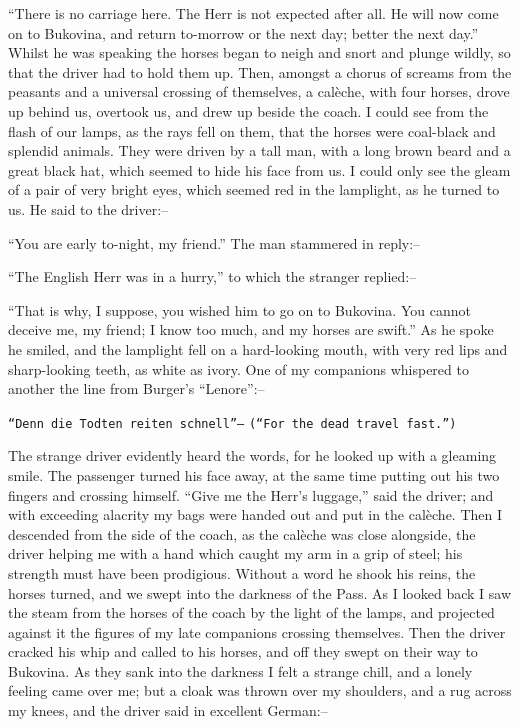 \documentclass[12pt,openright]{book}
\begin{document}
“There is no carriage here. The Herr is not expected after all. He will now come on to Bukovina, and return to-morrow or the next day; better the next day.” Whilst he was speaking the horses began to neigh and snort and plunge wildly, so that the driver had to hold them up. Then, amongst a chorus of screams from the peasants and a universal crossing of themselves, a calèche, with four horses, drove up behind us, overtook us, and drew up beside the coach. I could see from the flash of our lamps, as the rays fell on them, that the horses were coal-black and splendid animals. They were driven by a tall man, with a long brown beard and a great black hat, which seemed to hide his face from us. I could only see the gleam of a pair of very bright eyes, which seemed red in the lamplight, as he turned to us. He said to the driver:–

“You are early to-night, my friend.” The man stammered in reply:–

“The English Herr was in a hurry,” to which the stranger replied:–

“That is why, I suppose, you wished him to go on to Bukovina. You cannot deceive me, my friend; I know too much, and my horses are swift.” As he spoke he smiled, and the lamplight fell on a hard-looking mouth, with very red lips and sharp-looking teeth, as white as ivory. One of my companions whispered to another the line from Burger’s “Lenore”:–

\texttt{“Denn die Todten reiten schnell”--}
\texttt{(“For the dead travel fast.”)}

The strange driver evidently heard the words, for he looked up with a gleaming smile. The passenger turned his face away, at the same time putting out his two fingers and crossing himself. “Give me the Herr’s luggage,” said the driver; and with exceeding alacrity my bags were handed out and put in the calèche. Then I descended from the side of the coach, as the calèche was close alongside, the driver helping me with a hand which caught my arm in a grip of steel; his strength must have been prodigious. Without a word he shook his reins, the horses turned, and we swept into the darkness of the Pass. As I looked back I saw the steam from the horses of the coach by the light of the lamps, and projected against it the figures of my late companions crossing themselves. Then the driver cracked his whip and called to his horses, and off they swept on their way to Bukovina. As they sank into the darkness I felt a strange chill, and a lonely feeling came over me; but a cloak was thrown over my shoulders, and a rug across my knees, and the driver said in excellent German:–
\end{document}
